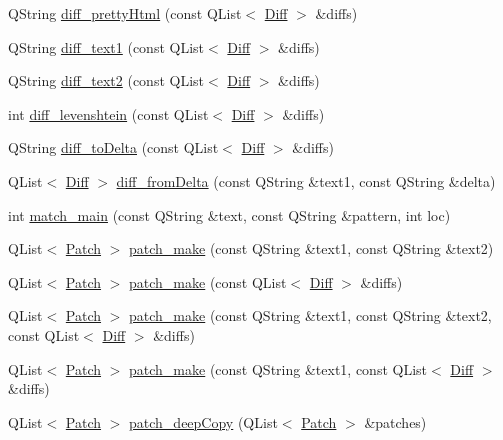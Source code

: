 \begin{DoxyCompactItemize}
\item 
QString \hyperlink{classdiff__match__patch_a3eeaf8a99e5d6f53e8994128d64f57f1}{diff\_\-prettyHtml} (const QList$<$ \hyperlink{class_diff}{Diff} $>$ \&diffs)
\item 
QString \hyperlink{classdiff__match__patch_a6a1995ece702b50091f3883518864ea7}{diff\_\-text1} (const QList$<$ \hyperlink{class_diff}{Diff} $>$ \&diffs)
\item 
QString \hyperlink{classdiff__match__patch_a9d3e1424496704a7e1d1f7995d465f20}{diff\_\-text2} (const QList$<$ \hyperlink{class_diff}{Diff} $>$ \&diffs)
\item 
int \hyperlink{classdiff__match__patch_a5183e0300c4fbe6b993cae9844f57c11}{diff\_\-levenshtein} (const QList$<$ \hyperlink{class_diff}{Diff} $>$ \&diffs)
\item 
QString \hyperlink{classdiff__match__patch_acc6b4e2d43c1be99c291049810bfc654}{diff\_\-toDelta} (const QList$<$ \hyperlink{class_diff}{Diff} $>$ \&diffs)
\item 
QList$<$ \hyperlink{class_diff}{Diff} $>$ \hyperlink{classdiff__match__patch_a70e244439ed3261a2a2c2ce092c45bc0}{diff\_\-fromDelta} (const QString \&text1, const QString \&delta)
\item 
int \hyperlink{classdiff__match__patch_aab1a27bfbb05e041a969617bf6594c23}{match\_\-main} (const QString \&text, const QString \&pattern, int loc)
\item 
QList$<$ \hyperlink{class_patch}{Patch} $>$ \hyperlink{classdiff__match__patch_afb9335ec40ffb7b74a822a1210d90e19}{patch\_\-make} (const QString \&text1, const QString \&text2)
\item 
QList$<$ \hyperlink{class_patch}{Patch} $>$ \hyperlink{classdiff__match__patch_ac5992f58192fc44530f33dd40202c165}{patch\_\-make} (const QList$<$ \hyperlink{class_diff}{Diff} $>$ \&diffs)
\item 
QList$<$ \hyperlink{class_patch}{Patch} $>$ \hyperlink{classdiff__match__patch_aaf3ea8fa0cd411d87dc465544fa68ac1}{patch\_\-make} (const QString \&text1, const QString \&text2, const QList$<$ \hyperlink{class_diff}{Diff} $>$ \&diffs)
\item 
QList$<$ \hyperlink{class_patch}{Patch} $>$ \hyperlink{classdiff__match__patch_a7fe185270bdffc221bd36f3f72635298}{patch\_\-make} (const QString \&text1, const QList$<$ \hyperlink{class_diff}{Diff} $>$ \&diffs)
\item 
QList$<$ \hyperlink{class_patch}{Patch} $>$ \hyperlink{classdiff__match__patch_aa4b405c41f79af23a8e60129c8e9a721}{patch\_\-deepCopy} (QList$<$ \hyperlink{class_patch}{Patch} $>$ \&patches)

\end{DoxyCompactItemize}
